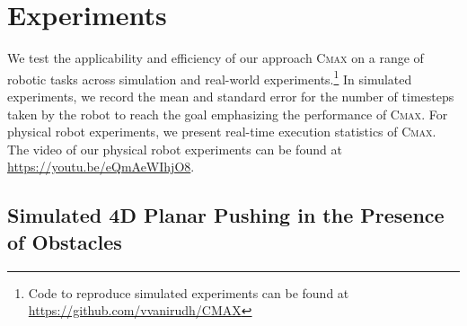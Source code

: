 \section{Experiments}
\label{sec:experiments}

We test the applicability and efficiency of our approach \textsc{Cmax} on a
range of robotic tasks across simulation and real-world
experiments.\footnote{Code to reproduce simulated
experiments can be found at
\url{https://github.com/vvanirudh/CMAX}}
In simulated experiments, we record the
mean and standard error for the number of timesteps taken by the
robot to reach the goal emphasizing the performance of
\textsc{Cmax}. For physical robot experiments, we present
real-time execution statistics of \textsc{Cmax}. The video of our
physical robot experiments can be found at 
\url{https://youtu.be/eQmAeWIhjO8}.


\subsection{Simulated 4D Planar Pushing in the Presence of Obstacles}
\label{sec:simulated-4d-planar}


